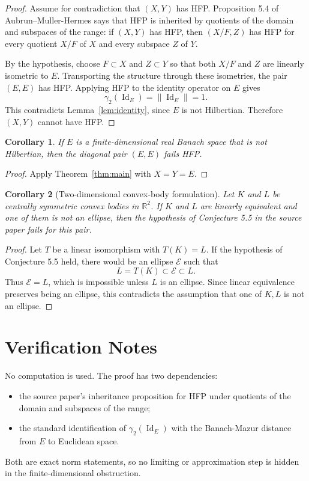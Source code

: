\documentclass[11pt]{article}
\newtheorem{corollary}{Corollary}
\DeclareMathOperator{\Id}{Id}
\begin{document}
\begin{proof}
Assume for contradiction that $(X,Y)$ has HFP. Proposition 5.4 of
Aubrun--Muller-Hermes says that HFP is inherited by quotients of the domain
and subspaces of the range: if $(X,Y)$ has HFP, then $(X/F,Z)$ has HFP for
every quotient $X/F$ of $X$ and every subspace $Z$ of $Y$.

By the hypothesis, choose $F\subset X$ and $Z\subset Y$ so that both $X/F$
and $Z$ are linearly isometric to $E$. Transporting the structure through
these isometries, the pair $(E,E)$ has HFP. Applying HFP to the identity
operator on $E$ gives
\[
  \gamma_2(\Id_E)=\|\Id_E\|=1.
\]
This contradicts Lemma~\ref{lem:identity}, since $E$ is not Hilbertian.
Therefore $(X,Y)$ cannot have HFP.
\end{proof}

\begin{corollary}
If $E$ is a finite-dimensional real Banach space that is not Hilbertian, then
the diagonal pair $(E,E)$ fails HFP.
\end{corollary}

\begin{proof}
Apply Theorem~\ref{thm:main} with $X=Y=E$.
\end{proof}

\begin{corollary}[Two-dimensional convex-body formulation]
Let $K$ and $L$ be centrally symmetric convex bodies in $\mathbb R^2$. If
$K$ and $L$ are linearly equivalent and one of them is not an ellipse, then
the hypothesis of Conjecture 5.5 in the source paper fails for this pair.
\end{corollary}

\begin{proof}
Let $T$ be a linear isomorphism with $T(K)=L$. If the hypothesis of
Conjecture 5.5 held, there would be an ellipse $\mathcal E$ such that
\[
  L=T(K)\subset \mathcal E\subset L.
\]
Thus $\mathcal E=L$, which is impossible unless $L$ is an ellipse. Since
linear equivalence preserves being an ellipse, this contradicts the
assumption that one of $K,L$ is not an ellipse.
\end{proof}

\section*{Verification Notes}

No computation is used. The proof has two dependencies:
\begin{itemize}
  \item the source paper's inheritance proposition for HFP under quotients of
  the domain and subspaces of the range;
  \item the standard identification of $\gamma_2(\Id_E)$ with the
  Banach-Mazur distance from $E$ to Euclidean space.
\end{itemize}
Both are exact norm statements, so no limiting or approximation step is hidden
in the finite-dimensional obstruction.
\end{document}
